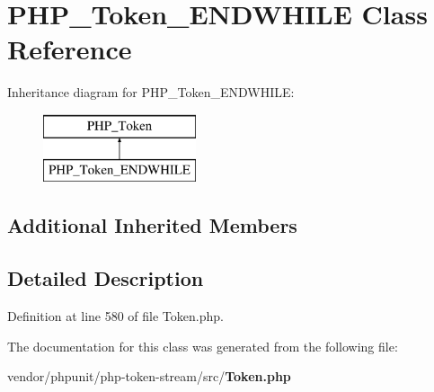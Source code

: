 \section{P\+H\+P\+\_\+\+Token\+\_\+\+E\+N\+D\+W\+H\+I\+L\+E Class Reference}
\label{class_p_h_p___token___e_n_d_w_h_i_l_e}
Inheritance diagram for P\+H\+P\+\_\+\+Token\+\_\+\+E\+N\+D\+W\+H\+I\+L\+E\+:\begin{figure}[H]
\begin{center}
\leavevmode
\includegraphics[height=2.000000cm]{class_p_h_p___token___e_n_d_w_h_i_l_e}
\end{center}
\end{figure}
\subsection*{Additional Inherited Members}


\subsection{Detailed Description}


Definition at line 580 of file Token.\+php.



The documentation for this class was generated from the following file\+:\begin{DoxyCompactItemize}
\item 
vendor/phpunit/php-\/token-\/stream/src/{\bf Token.\+php}\end{DoxyCompactItemize}
